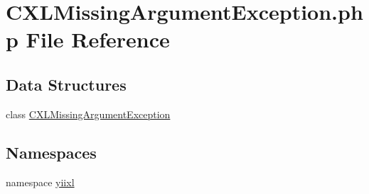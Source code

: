 \hypertarget{CXLMissingArgumentException_8php}{
\section{CXLMissingArgumentException.php File Reference}
\label{CXLMissingArgumentException_8php}
}
\subsection*{Data Structures}
\begin{DoxyCompactItemize}
\item 
class \hyperlink{classCXLMissingArgumentException}{CXLMissingArgumentException}
\end{DoxyCompactItemize}
\subsection*{Namespaces}
\begin{DoxyCompactItemize}
\item 
namespace \hyperlink{namespaceyiixl}{yiixl}
\end{DoxyCompactItemize}
